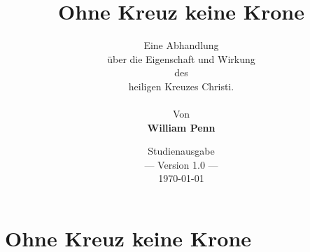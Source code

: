 \documentclass[a5paper,pagesize,9pt]{scrbook}
\begin{document}
\author{
Eine Abhandlung \\
über die Eigenschaft und Wirkung
\\
des
\\
heiligen Kreuzes Christi.
\\
\\
Von
\\
\textbf{William Penn}
}

\title{Ohne Kreuz keine Krone}
\date{Studienausgabe \\ --- Version 1.0 --- \\ \today}

\maketitle

\frontmatter

\tableofcontents




\mainmatter
\part{Ohne Kreuz keine Krone}


\end{document}

